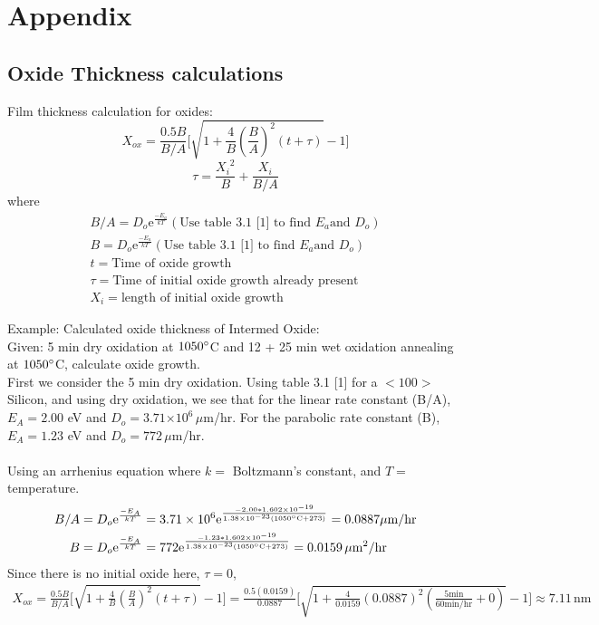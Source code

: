 \documentclass{article}
\newcommand{\me}{\mathrm{e}}
\providecommand{\e}[1]{\ensuremath{\times 10^{#1}}}
\begin{document}
\section{Appendix}

\subsection{Oxide Thickness calculations}
\label{sec:oxide}
Film thickness calculation for oxides:
\begin{equation}
X_{ox} = \frac{0.5B}{B/A}\Big[\sqrt{1 + \frac{4}{B}(\frac{B}{A})^2(t + \tau)} - 1\Big]
\end{equation}
\begin{equation}
\tau = \frac{{X_i}^2}{B} + \frac{X_i}{B/A}
\end{equation}
where
\begin{align*}
B/A = D_o\me^{\frac{-E_a}{kT}} (\text{Use table 3.1 [1] to find }E_a \text{and } D_o) \\
B = D_o\me^{\frac{-E_a}{kT}} (\text{Use table 3.1 [1] to find }E_a \text{and } D_o) \\
t = \text{Time of oxide growth} \\ 
\tau = \text{Time of initial oxide growth already present} \\
X_i = \text{length of initial oxide growth}
\end{align*}

Example: Calculated oxide thickness of Intermed Oxide: \\
Given: 5 min dry oxidation at $1050\degree$C and 12 + 25 min wet oxidation annealing at $1050\degree$C, calculate oxide growth. \\

First we consider the 5 min dry oxidation. Using table 3.1 [1] for a $<100>$ Silicon, and using dry oxidation, we see that for the linear rate constant (B/A), $E_A = 2.00$ eV and $D_o = 3.71\e{6} \, \mu$m/hr. For the parabolic rate constant (B), $E_A = 1.23$ eV and $D_o = 772\, \mu$m/hr. \\ \\
Using an arrhenius equation where $k =$ Boltzmann's constant, and $T = $ temperature. 
\begin{align*}
B/A &= D_o\me^{\frac{-E_A}{kT}} = 3.71\e{6}\me^{\frac{-2.00*1.602\e{-19}}{1.38\e{-23}(1050\degree\text{C} + 273)}} = 0.0887 \mu\text{m/hr} \\
B &= D_o\me^{\frac{-E_A}{kT}} = 772\me^{\frac{-1.23*1.602\e{-19}}{1.38\e{-23}(1050\degree\text{C} + 273)}} = 0.0159 \,{\mu\text{m}}^2\text{/hr}
\end{align*}
Since there is no initial oxide here, $\tau = 0$,
\begin{align*}
X_{ox} = \frac{0.5B}{B/A}\Big[\sqrt{1 + \frac{4}{B}(\frac{B}{A})^2(t + \tau)} - 1\Big] = \frac{0.5 (0.0159)}{0.0887}\Big[\sqrt{1 + \frac{4}{0.0159}(0.0887)^2(\frac{5\text{min}}{60\text{min/hr}} + 0)} - 1\Big] \approx 7.11 \, \text{nm}
\end{align*}
\end{document}
